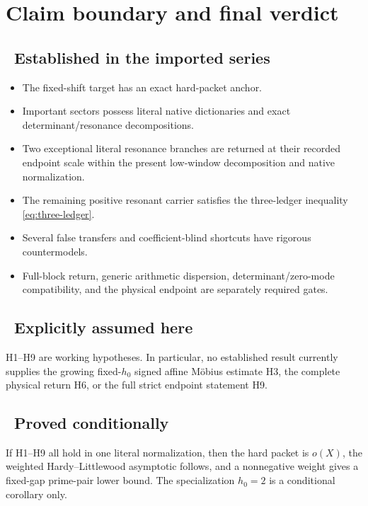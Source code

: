 \section{Claim boundary and final verdict}
\label{sec:claim-boundary}

\subsection*{\Etag\ Established in the imported series}

\begin{itemize}[leftmargin=2em]
\item The fixed-shift target has an exact hard-packet anchor.
\item Important sectors possess literal native dictionaries and
  exact determinant/resonance decompositions.
\item Two exceptional literal resonance branches are returned at
  their recorded endpoint scale within the present low-window
  decomposition and native normalization.
\item The remaining positive resonant carrier satisfies the
  three-ledger inequality \eqref{eq:three-ledger}.
\item Several false transfers and coefficient-blind shortcuts have
  rigorous countermodels.
\item Full-block return, generic arithmetic dispersion,
  determinant/zero-mode compatibility, and the physical endpoint are
  separately required gates.
\end{itemize}

\subsection*{\Htag\ Explicitly assumed here}

H1--H9 are working hypotheses.  In particular, no established result
currently supplies the growing fixed-\(h_0\) signed affine M\"obius
estimate H3, the complete physical return H6, or the full strict
endpoint statement H9.

\subsection*{\Ctag\ Proved conditionally}

If H1--H9 all hold in one literal normalization, then the hard packet
is \(o(X)\), the weighted Hardy--Littlewood asymptotic follows, and a
nonnegative weight gives a fixed-gap prime-pair lower bound.  The
specialization \(h_0=2\) is a conditional corollary only.

